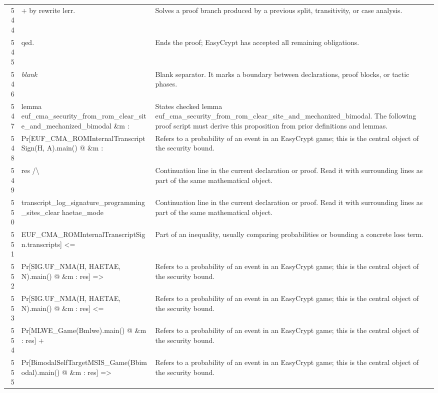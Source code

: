 \documentclass[10pt]{article}
\begin{document}
\begin{longtable}{r L{0.53\textwidth} L{0.37\textwidth}}
544 & {\ttfamily\scriptsize + by rewrite lerr.} & Solves a proof branch produced by a previous split, transitivity, or case analysis. \\
545 & {\ttfamily\scriptsize qed.} & Ends the proof; EasyCrypt has accepted all remaining obligations. \\
546 & {\ttfamily\scriptsize \emph{blank}} & Blank separator.  It marks a boundary between declarations, proof blocks, or tactic phases. \\
547 & {\ttfamily\scriptsize lemma euf\_cma\_security\_from\_rom\_clear\_site\_and\_mechanized\_bimodal \&m :} & States checked lemma euf\_cma\_security\_from\_rom\_clear\_site\_and\_mechanized\_bimodal.  The following proof script must derive this proposition from prior definitions and lemmas. \\
548 & {\ttfamily\scriptsize   Pr[EUF\_CMA\_ROMInternalTranscriptSign(H, A).main() @ \&m :} & Refers to a probability of an event in an EasyCrypt game; this is the central object of the security bound. \\
549 & {\ttfamily\scriptsize       res /\textbackslash{}} & Continuation line in the current declaration or proof.  Read it with surrounding lines as part of the same mathematical object. \\
550 & {\ttfamily\scriptsize       transcript\_log\_signature\_programming\_sites\_clear haetae\_mode} & Continuation line in the current declaration or proof.  Read it with surrounding lines as part of the same mathematical object. \\
551 & {\ttfamily\scriptsize         EUF\_CMA\_ROMInternalTranscriptSign.transcripts] <=} & Part of an inequality, usually comparing probabilities or bounding a concrete loss term. \\
552 & {\ttfamily\scriptsize     Pr[SIG.UF\_NMA(H, HAETAE, N).main() @ \&m : res] =>} & Refers to a probability of an event in an EasyCrypt game; this is the central object of the security bound. \\
553 & {\ttfamily\scriptsize   Pr[SIG.UF\_NMA(H, HAETAE, N).main() @ \&m : res] <=} & Refers to a probability of an event in an EasyCrypt game; this is the central object of the security bound. \\
554 & {\ttfamily\scriptsize     Pr[MLWE\_Game(Bmlwe).main() @ \&m : res] +} & Refers to a probability of an event in an EasyCrypt game; this is the central object of the security bound. \\
555 & {\ttfamily\scriptsize     Pr[BimodalSelfTargetMSIS\_Game(Bbimodal).main() @ \&m : res] =>} & Refers to a probability of an event in an EasyCrypt game; this is the central object of the security bound. \\

\end{longtable}
\end{document}
